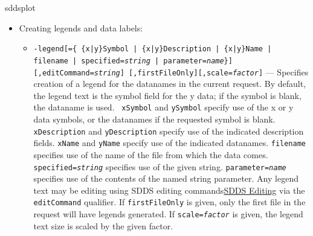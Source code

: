 \begin{sddsprog}{sddsplot}
\begin{itemize}
\begin{itemize}
  \item {\tt -enumeratedScales=[interval={\em integer}][,limit={\em integer}][,scale={\em
factor}]} {\tt [,allTicks][,rotate][,editCommand={\em string}]} --- Allows control of the display of
enumerated value strings when the x data is of string type.  {\tt interval={\em N}} specifies
displaying and making a tick for every $N {th}$ enumerated value; the default is 1.  Also, {\tt
limit={\em M}} specifies displaying and making a tick for only $M$ enumerated values at equal
spacing; the default is unlimited.  If one of these options is employed but one desires to see all
the ticks (even those without labels), the {\tt allTicks} qualifier may be given.  {\tt scale}
specifies a factor by which to increase the size of the text.  {\tt rotate} specifies rotation of the
printed text from the normal orientation to the optional orientation; if enumerated data is displayed
along the x dimension, the normal (optional) orientation is vertical (horizontal) printing.  These
are reversed if the enumerated data is displayed along the y dimension.

  \end{itemize}
\item Creating legends and data labels:
  \begin{itemize}

  \item {\tt -legend[=\{ \{x|y\}Symbol | \{x|y\}Description | \{x|y\}Name | filename | 
 specified={\em string} | parameter={\em name}\}] [,editCommand={\em string}]
  [,firstFileOnly][,scale={\em factor}]} \rm
--- Specifies creation of a legend for the datanames in the current request.  By default, the
legend text is the symbol field for the y data; if the symbol is blank, the dataname is used.  {\tt
xSymbol} and {\tt ySymbol} specify use of the x or y data symbols, or the datanames if the requested
symbol is blank.  {\tt xDescription} and {\tt yDescription} specify use of the indicated description
fields.  {\tt xName} and {\tt yName} specify use of the indicated datanames.  {\tt filename}
specifies use of the name of the file from which the data comes.  {\tt specified={\em string}}
specifies use of the given string.  {\tt parameter={\em name}} specifies use of the contents of the
named string parameter.  Any legend text may be editing using SDDS editing commands\hyperref[SDDSediting]{SDDS Editing} via the {\tt editCommand} qualifier.  If {\tt firstFileOnly} is given, only the first file
in the request will have legends generated.  If {\tt scale={\em factor}} is given, the legend text
size is scaled by the given factor.


\end{itemize}
\end{itemize}
\end{sddsprog}
